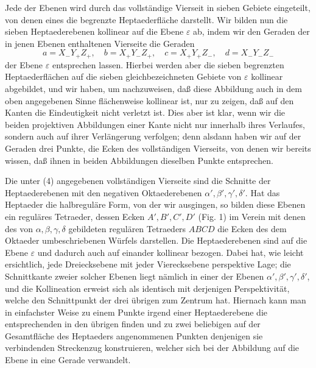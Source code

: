 \documentclass[11pt,a4paper]{article}
\begin{document}
Jede der Ebenen wird durch das vollst\"andige Vierseit in sieben Gebiete eingeteilt, von denen eines die begrenzte Heptaederfl\"ache darstellt. Wir bilden nun die sieben Heptaederebenen kollinear auf die Ebene $\varepsilon$ ab, indem wir den Geraden der in jenen Ebenen enthaltenen Vierseite die Geraden
\[
 a=X_-Y_+Z_+,
 \quad b=X_+Y_-Z_+,
 \quad c=X_+Y_+Z_-,
 \quad d=X_-Y_-Z_-
\]
der Ebene $\varepsilon$ entsprechen lassen. Hierbei werden aber die sieben begrenzten Heptaederfl\"achen auf die sieben gleichbezeichneten Gebiete von $\varepsilon$ kollinear abgebildet, und wir haben, um nachzuweisen, da\ss{} diese Abbildung auch in dem oben angegebenen Sinne fl\"achenweise kollinear ist, nur zu zeigen, da\ss{} auf den Kanten die Eindeutigkeit nicht verletzt ist. Dies aber ist klar, wenn wir die beiden projektiven Abbildungen einer Kante nicht nur innerhalb ihres Verlaufes, sondern auch auf ihrer Verl\"angerung verfolgen; denn alsdann haben wir auf der Geraden drei Punkte, die Ecken des vollst\"andigen Vierseits, von denen wir bereits wissen, da\ss{} ihnen in beiden Abbildungen dieselben Punkte entsprechen.

Die unter (4) angegebenen vollst\"andigen Vierseite sind die Schnitte der Heptaederebenen mit den negativen Oktaederebenen $\alpha',\beta',\gamma',\delta'$. Hat das Heptaeder die halbregul\"are Form, von der wir ausgingen, so bilden diese Ebenen ein regul\"ares Tetraeder, dessen Ecken $A',B',C',D'$ (Fig. 1) im Verein mit denen des von $\alpha,\beta,\gamma,\delta$ gebildeten regul\"aren Tetraeders $ABCD$ die Ecken des dem Oktaeder umbeschriebenen W\"urfels darstellen. Die Heptaederebenen sind auf die Ebene $\varepsilon$ und dadurch auch auf einander kollinear bezogen. Dabei hat, wie leicht ersichtlich, jede Dreiecksebene mit jeder Vierecksebene perspektive Lage; die Schnittkante zweier solcher Ebenen liegt n\"amlich in einer der Ebenen $\alpha',\beta',\gamma',\delta'$, und die Kollineation erweist sich als identisch mit derjenigen Perspektivit\"at, welche den Schnittpunkt der drei \"ubrigen zum Zentrum hat. Hiernach kann man in einfachster Weise zu einem Punkte irgend einer Heptaederebene die entsprechenden in den \"ubrigen finden und zu zwei beliebigen auf der Gesamtfl\"ache des Heptaeders angenommenen Punkten denjenigen sie verbindenden Streckenzug konstruieren, welcher sich bei der Abbildung auf die Ebene in eine Gerade verwandelt.
\end{document}
